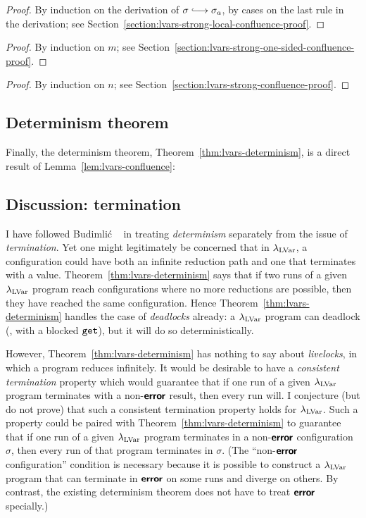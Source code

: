\LVarsLemStrongLocalConfluence
\begin{proof}
  By induction on the derivation of $\conf \parstepsto \conf_a$, by
  cases on the last rule in the derivation; see
  Section~\ref{section:lvars-strong-local-confluence-proof}.
\end{proof}

\LVarsLemStrongOneSidedConfluence
\begin{proof}
  By induction on $m$; see
  Section~\ref{section:lvars-strong-one-sided-confluence-proof}.
\end{proof}

\LVarsLemStrongConfluence
\begin{proof}
  By induction on $n$; see
  Section~\ref{section:lvars-strong-confluence-proof}.
\end{proof}

\LVarsLemConfluence

\subsection{Determinism theorem}

Finally, the determinism theorem, Theorem~\ref{thm:lvars-determinism},
is a direct result of Lemma~\ref{lem:lvars-confluence}:

\LVarsThmDeterminism

\subsection{Discussion: termination}

I have followed Budimli\'c \etal~\cite{CnC} in treating
\emph{determinism} separately from the issue of \emph{termination}.
Yet one might legitimately be concerned that in $\lambda_{\textrm{LVar}}$, a
configuration could have both an infinite reduction path and one that
terminates with a value.  Theorem~\ref{thm:lvars-determinism} says
that if two runs of a given $\lambda_{\textrm{LVar}}$ program reach configurations
where no more reductions are possible, then they have reached the same
configuration.  Hence Theorem~\ref{thm:lvars-determinism} handles the
case of \emph{deadlocks} already: a $\lambda_{\textrm{LVar}}$ program can deadlock
(\eg, with a blocked $\mbox{\texttt{get}}$), but it will do so deterministically.

However, Theorem~\ref{thm:lvars-determinism} has nothing to say about
\emph{livelocks}, in which a program reduces infinitely.  It would be
desirable to have a \emph{consistent termination} property which would
guarantee that if one run of a given $\lambda_{\textrm{LVar}}$ program terminates
with a non-$\textbf{\textsf{error}}$ result, then every run will.  I conjecture (but do
not prove) that such a consistent termination property holds for
$\lambda_{\textrm{LVar}}$.  Such a property could be paired with
Theorem~\ref{thm:lvars-determinism} to guarantee that if one run of a
given $\lambda_{\textrm{LVar}}$ program terminates in a non-$\textbf{\textsf{error}}$ configuration
$\sigma$, then every run of that program terminates in $\sigma$.  (The
``non-$\textbf{\textsf{error}}$ configuration'' condition is necessary because it is
possible to construct a $\lambda_{\textrm{LVar}}$ program that can terminate in
$\textbf{\textsf{error}}$ on some runs and diverge on others.  By contrast, the
existing determinism theorem does not have to treat $\textbf{\textsf{error}}$
specially.)

